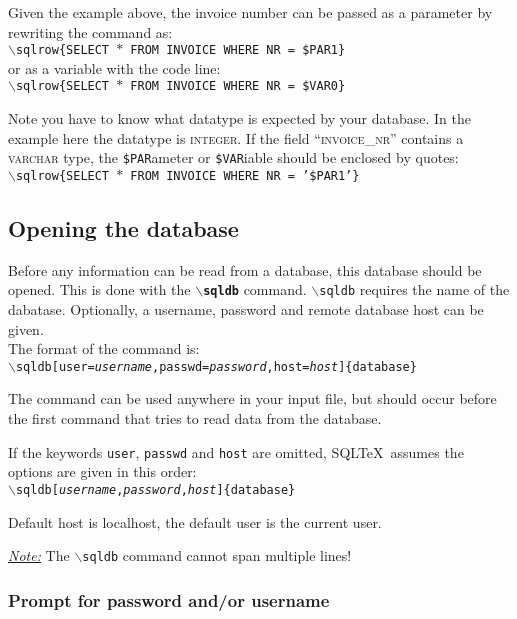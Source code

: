 \documentclass{article}
\newcommand{\bs}{\ensuremath{\backslash}}
\newcommand{\vs}{\vspace{3mm}}
\begin{document}
Given the example above, the invoice number can be passed as a parameter by rewriting the command as: \\
\texttt{\bs sqlrow\{SELECT $\ast$ FROM INVOICE WHERE NR = \$PAR1\}} \\
or as a variable with the code line: \\
\texttt{\bs sqlrow\{SELECT $\ast$ FROM INVOICE WHERE NR = \$VAR0\}}

Note you have to know what datatype is expected by your database. In the example here the datatype is
\textsc{integer}. If the field ``\textsc{invoice\_nr}'' contains a \textsc{varchar} type, the
\texttt{\$PAR}ameter or \texttt{\$VAR}iable should be enclosed by quotes: \\
\texttt{\bs sqlrow\{SELECT $\ast$ FROM INVOICE WHERE NR = '\$PAR1'\}}

\subsection{Opening the database}\label{opendb}

Before any information can be read from a database, this database should be opened.
This is done with the \texttt{\textbf{\bs sqldb}} command.
\texttt{\bs sqldb} requires the name of the dabatase. Optionally, a username, password and remote database host can be given. \\
The format of the command is:\\
\texttt{\bs sqldb[user=\textit{username},passwd=\textit{password},host=\textit{host}]\{database\}}

The command can be used anywhere in your input file, but should occur before the first command that tries to
read data from the database.

\vs

If the keywords \texttt{user}, \texttt{passwd} and \texttt{host} are omitted, SQL\TeX\ assumes the options are given in
this order:\\
\texttt{\bs sqldb[\textit{username},\textit{password},\textit{host}]\{database\}}

Default host is localhost, the default user is the current user.

\vs

\noindent\hspace{-3mm}\textit{\underline{Note:}} The \texttt{\bs sqldb} command cannot span multiple lines!

\subsubsection{Prompt for password and/or username}
\end{document}

